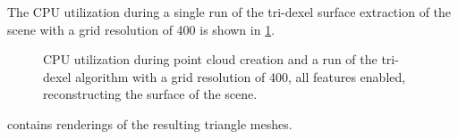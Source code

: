 The CPU utilization during a single run of the tri-dexel surface extraction of the \impeller scene with a grid resolution of 400 is shown in \cref{fig:td_hq_impeller_cpu}.

\begin{figure}
	\centering
	\caption[Tri-dexel CPU utilization]{
		CPU utilization during point cloud creation and a run of the tri-dexel algorithm with a grid resolution of 400, all features enabled, reconstructing the surface of the \impeller scene.
	}
	\label{fig:td_hq_impeller_cpu}
\end{figure}

 contains renderings of the resulting triangle meshes.

